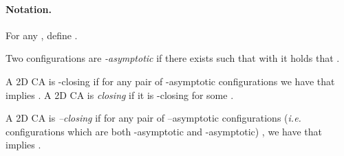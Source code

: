 \documentclass{llncs}
\makeatletter
\newcommand{\ie}{\emph{i.e.}\@\xspace}
\newcommand{\wrt}{w.r.t.\@\xspace}
\newcommand{\ignore}[1]{}
\makeatother
\begin{document}
\paragraph{Notation.} For any , define .
\begin{definition}
 Two configurations  are
\emph{-asymptotic} if there exists  such that
 with 
it holds that .
\end{definition}
\begin{definition}[-closingness]
A 2D CA  is -closing if for any pair of
-asymptotic configurations  we have
that  implies . A 2D CA is \emph{closing}
if it is -closing for some .
\end{definition}
\ignore{
\begin{definition}[4-closingness]
A 2D CA  is \emph{4-closing} if there exist a pair 
of independent vectors such that  is -closing for all
).
\end{definition}
}
\ignore{
Remark that a 2D CA can be closing \wrt a certain direction but
may not be closing \wrt another one. For example, consider the 
radius  2D CA on the binary alphabet whose local rule 
performs the xor operator on the four corners of the Moore neighborhood. It is easy
to observe that this CA is -closing but it is not
-closing. \textbf{OCIO}}

\begin{definition}[--closingness]
A 2D CA  is \emph{--closing} if for any pair of
--asymptotic configurations (\ie
configurations which are both -asymptotic and 
-asymptotic)
, we have that  implies .
\end{definition}
\end{document}
